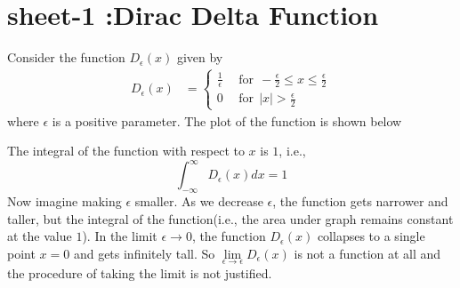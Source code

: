 \chapter{sheet-1 :Dirac Delta Function}
\label{chapter1.dirac-delta}

	Consider the function $D_\epsilon(x)$ given by
	\begin{eqnarray}
	D_\epsilon(x) &= 
		\begin{cases}
			\frac{1}{\epsilon} \ \ &\text{for} \ \  -\frac{\epsilon}{2} \leq x \leq \frac{\epsilon}{2} \\
			0 \ \ &\text{for} \ \  |x| > \frac{\epsilon}{2} 
		\end{cases}
	\end{eqnarray}
	where $\epsilon$ is a positive parameter. The plot of the function is shown below
	
	
	
	The integral of the function with respect to $x$ is $1$, i.e.,
	\begin{equation}
		\int_{-\infty}^{\infty} D_\epsilon(x) dx = 1
	\end{equation}
	Now imagine making $\epsilon$ smaller. As we decrease $\epsilon$, the function gets narrower and taller, but the integral of the function(i.e., the area under graph remains constant at the value $1$).
	In the limit $\epsilon \rightarrow 0$, the function $D_\epsilon(x)$ collapses to a single  point $x=0$ and gets infinitely tall. So $\lim\limits_{\epsilon \rightarrow \epsilon} D_\epsilon(x)$ is not a function at all and the procedure of taking the limit is not justified.
	\\
	
